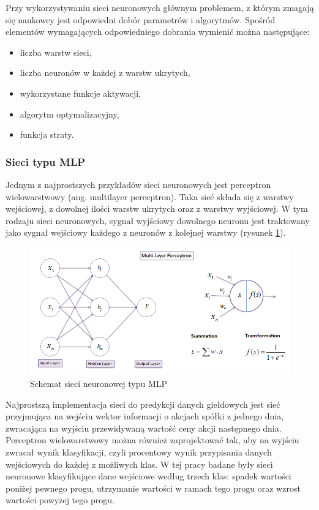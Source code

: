 \documentclass[a4paper, twoside, 11pt, openright]{article}
\begin{document}
\bigskip

Przy wykorzystywaniu sieci neuronowych głównym problemem, z którym zmagają się naukowcy jest odpowiedni dobór parametrów i algorytmów. Spośród elementów wymagających odpowiedniego dobrania wymienić można następujące:
\begin{itemize}
\item liczba warstw sieci,
\item liczba neuronów w każdej z warstw ukrytych,
\item wykorzystane funkcje aktywacji,
\item algorytm optymalizacyjny,
\item funkcja straty.
\end{itemize}


\subsubsection{Sieci typu MLP \cite{mlp}}

Jednym z najprostszych przykładów sieci neuronowych jest perceptron wielowarstwowy (ang. multilayer perceptron). Taka sieć składa się z warstwy wejściowej, z dowolnej ilości warstw ukrytych oraz z warstwy wyjściowej. W tym rodzaju sieci neuronowych, sygnał wyjściowy dowolnego neuronu jest traktowany jako sygnał wejściowy każdego z neuronów z kolejnej warstwy (rysunek \ref{img:neural-net}). 

\bigskip

\begin{figure}[H]
\centering \includegraphics[scale=0.7]{img/nn.png}
\caption{Schemat sieci neuronowej typu MLP \cite{mlpnn}}
\label{img:neural-net}
\end{figure}

Najprostszą implementacja sieci do predykcji danych giełdowych jest sieć przyjmująca na wejściu wektor informacji o akcjach spółki z jednego dnia, zwracająca na wyjściu przewidywaną wartość ceny akcji następnego dnia. Perceptron wielowarstwowy można również zaprojektować tak, aby na wyjściu zwracał wynik klasyfikacji, czyli procentowy wynik przypisania danych wejściowych do każdej z możliwych klas. W tej pracy badane były sieci neuronowe klasyfikujące dane wejściowe według trzech klas: spadek wartości poniżej pewnego progu, utrzymanie wartości w ramach tego progu oraz wzrost wartości powyżej tego progu. 
\end{document}
